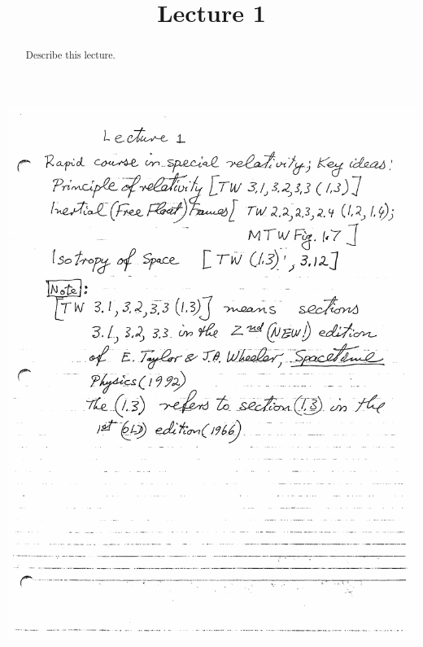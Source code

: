 \documentclass{ximera}
\title{Lecture 1}
\begin{document}
\begin{abstract}
Describe this lecture.
\end{abstract}
\maketitle

\begin{image}
\includegraphics{lecture01.pdf}
\end{image}
\end{document}
